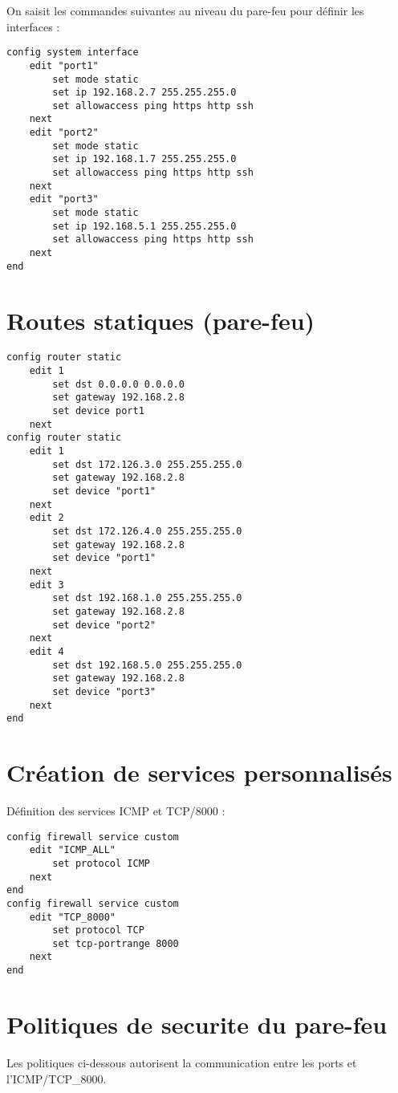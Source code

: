 \documentclass[11pt,a4paper]{report}
\begin{document}
On saisit les commandes suivantes au niveau du pare-feu pour définir les interfaces :

\begin{lstlisting}[language={},caption={Configuration des interfaces - pare-feu}]
config system interface
    edit "port1"
        set mode static
        set ip 192.168.2.7 255.255.255.0
        set allowaccess ping https http ssh
    next
    edit "port2"
        set mode static
        set ip 192.168.1.7 255.255.255.0
        set allowaccess ping https http ssh
    next
    edit "port3"
        set mode static
        set ip 192.168.5.1 255.255.255.0
        set allowaccess ping https http ssh
    next
end
\end{lstlisting}

\section{Routes statiques (pare-feu)}
\begin{lstlisting}[language={},caption={Routes statiques - pare-feu}]
config router static
    edit 1
        set dst 0.0.0.0 0.0.0.0
        set gateway 192.168.2.8
        set device port1
    next
config router static
    edit 1
        set dst 172.126.3.0 255.255.255.0
        set gateway 192.168.2.8
        set device "port1"
    next
    edit 2
        set dst 172.126.4.0 255.255.255.0
        set gateway 192.168.2.8
        set device "port1"
    next
    edit 3
        set dst 192.168.1.0 255.255.255.0
        set gateway 192.168.2.8
        set device "port2"
    next
    edit 4
        set dst 192.168.5.0 255.255.255.0
        set gateway 192.168.2.8
        set device "port3"
    next
end
\end{lstlisting}

\section{Création de services personnalisés}
Définition des services ICMP et TCP/8000 :

\begin{lstlisting}[language={},caption={Services personnalisés - pare-feu}]
config firewall service custom
    edit "ICMP_ALL"
        set protocol ICMP
    next
end
config firewall service custom
    edit "TCP_8000"
        set protocol TCP
        set tcp-portrange 8000
    next
end
\end{lstlisting}

\section{Politiques de securite du pare-feu}
Les politiques ci-dessous autorisent la communication entre les ports et l'ICMP/TCP_8000.
\end{document}
